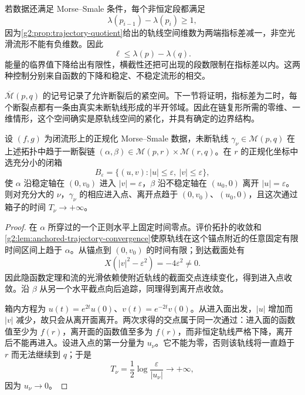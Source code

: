 若数据还满足 Morse--Smale 条件，每个非恒定段都满足
\[
	\lambda(p_{i-1})-\lambda(p_i)\ge1,
\]
因为\cref{g2:prop:trajectory-quotient}给出的轨线空间维数为两端指标差减一，非空光滑流形不能有负维数。因此
\[
	\ell\le\lambda(p)-\lambda(q).
\]
能量的临界值下降给出有限性，横截性还把可出现的段数限制在指标差以内。这两种控制分别来自函数的下降和稳定、不稳定流形的相交。

\ProseParagraphBreak

\(\overline{\mathcal M}(p,q)\) 的记号记录了允许断裂后的紧空间。下一节将证明，指标差为二时，每个断裂点都有一条由真实未断轨线形成的半开邻域。因此在链复形所需的零维、一维情形，这个空间确实是原轨线空间的紧化，并具有确定的边界结构。

\begin{lemma}\label{g2:lem:broken-local-crossing}
	设 \((f,g)\) 为闭流形上的正规化 Morse--Smale 数据，未断轨线 \(\gamma_\nu\in\mathcal M(p,q)\) 在上述拓扑中趋于一断裂链 \((\alpha,\beta)\in\mathcal M(p,r)\times\mathcal M(r,q)\)。在 \(r\) 的正规化坐标中选充分小的闭箱
	\[
		B_\varepsilon=\{(u,v):|u|\le\varepsilon,\ |v|\le\varepsilon\},
	\]
	使 \(\alpha\) 沿稳定轴在 \((0,v_0)\) 进入 \(|v|=\varepsilon\)，\(\beta\) 沿不稳定轴在 \((u_0,0)\) 离开 \(|u|=\varepsilon\)。则对充分大的 \(\nu\)，\(\gamma_\nu\) 的相应进入点、离开点趋于 \((0,v_0)\)、\((u_0,0)\)，且这次通过箱子的时间 \(T_\nu\to+\infty\)。
\end{lemma}
\begin{proof}
	在 \(\alpha\) 所穿过的一个正则水平上固定时间零点。评价拓扑的收敛和\cref{g2:lem:anchored-trajectory-convergence}使原轨线在这个锚点附近的任意固定有限时间区间上趋于 \(\alpha\)。从锚点到 \((0,v_0)\) 的时间有限；到达截面处有
	\[
		X(|v|^2-\varepsilon^2)=-4\varepsilon^2\ne0.
	\]
	因此隐函数定理和流的光滑依赖使附近轨线的截面交点连续变化，得到进入点收敛。沿 \(\beta\) 从另一个水平截点向后追踪，同理得到离开点收敛。

	箱内方程为 \(u(t)=e^{2t}u(0)\)、\(v(t)=e^{-2t}v(0)\)。从进入面出发，\(|u|\) 增加而 \(|v|\) 减少，故只会从离开面离开。两次求得的交点属于同一次通过：进入面的函数值至少为 \(f(r)\)，离开面的函数值至多为 \(f(r)\)，而非恒定轨线严格下降，离开后不能再进入。设进入点的第一分量为 \(u_\nu\)。它不能为零，否则该轨线将一直趋于 \(r\) 而无法继续到 \(q\)；于是
	\[
		T_\nu=\frac12\log\frac{\varepsilon}{|u_\nu|}\longrightarrow+\infty,
	\]
	因为 \(u_\nu\to0\)。
\end{proof}

